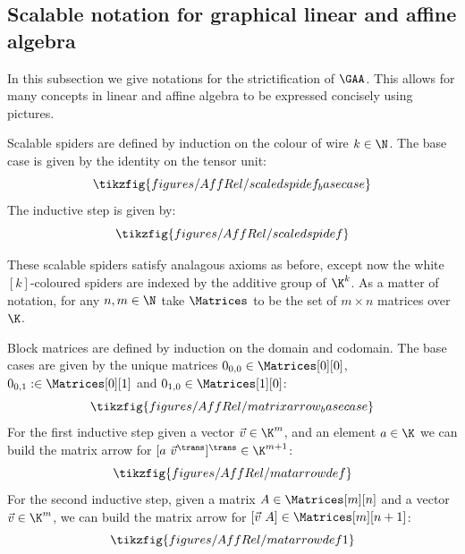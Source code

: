 \subsection{Scalable notation for graphical linear and affine algebra}
\label{ssec:scalable_gaa}
In this subsection we give notations for the strictification of \(\GAA\). This allows for many concepts
in linear and affine algebra to be expressed concisely using pictures.
\begin{definition}
  Scalable spiders are defined by induction on the colour of wire \(k\in\N\).
  The base case is given by the identity on the tensor unit:
  \begin{equation}
    \tikzfig{figures/AffRel/scaledspidef_basecase}
  \end{equation}
  The inductive step is given by:
  \begin{equation}
    \label{eq:GAAthickspiders}
    \tikzfig{figures/AffRel/scaledspidef}
  \end{equation}
\end{definition}
These scalable spiders satisfy analagous axioms as before, except now the white \([k]\)-coloured spiders are indexed by the additive group of \(\K^k\).
As a matter of notation, for any \(n,m\in\N\) take \(\Matrices\) to be the set of \(m \times n\) matrices over \(\K\).
\begin{definition}
  \label{def:matrix_arrow}
Block matrices are defined by induction on the domain and codomain.
  The base cases are given by the unique matrices \(0_{0,0}\in \Matrices[0][0]\), \(0_{0,1}:\in \Matrices[0][1]\) and \(0_{1,0}\in \Matrices[1][0]\):
  \begin{equation}
    \tikzfig{figures/AffRel/matrixarrow_basecase}
  \end{equation}
  For the first inductive step given a vector \(\vec v \in \K^m\), and an element \(a\in\K\) we can build the matrix arrow  for \( [a  \ {\vec v}^\trans]^\trans \in \K^{m+1}\):
  \begin{equation}
    \label{eq:blockmatrixinductivestep0}
    \tikzfig{figures/AffRel/matarrowdef}
  \end{equation}
  For the second inductive step, given a matrix \(A\in \Matrices[m][n]\) and a vector  \(\vec v\in \K^m \), we can build the matrix arrow for  \([\vec v \ A ] \in \Matrices[m][n+1]\):
  \begin{equation}
    \label{eq:blockmatrixinductivestep1}
    \tikzfig{figures/AffRel/matarrowdef1}
  \end{equation}
\end{definition}
